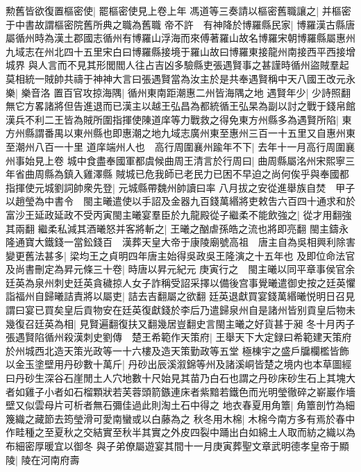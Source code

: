 勲舊皆欲復置樞密使|{
	罷樞密使見上卷上年}
馮道等三奏請以樞密舊職讓之|{
	并樞密于中書故謂樞密院舊所典之職為舊職}
帝不許　有神降於博羅縣民家|{
	博羅漢古縣唐屬循州時為漢土郡國志循州有博羅山浮海而來傅著羅山故名博羅宋朝博羅縣屬惠州九域志在州北四十五里宋白曰博羅縣接境于羅山故曰博羅東接龍州南接西平西接增城界}
與人言而不見其形閭閻人往占吉凶多驗縣吏張遇賢事之甚謹時循州盜賊羣起莫相統一賊帥共禱于神神大言曰張遇賢當為汝主於是共奉遇賢稱中天八國王改元永樂|{
	樂音洛}
置百官攻掠海隅|{
	循州東南距潮惠二州皆海隅之地}
遇賢年少|{
	少詩照翻}
無它方畧諸將但告進退而已漢主以越王弘昌為都統循王弘杲為副以討之戰于錢帛館漢兵不利二王皆為賊所圍指揮使陳道庠等力戰救之得免東方州縣多為遇賢所陷|{
	東方州縣謂番禺以東州縣也即惠潮之地九域志廣州東至惠州三百一十五里又自惠州東至潮州八百一十里}
道庠端州人也　高行周圍襄州踰年不下|{
	去年十一月高行周圍襄州事始見上卷}
城中食盡奉國軍都虞候曲周王清言於行周曰|{
	曲周縣屬洺州宋熙寧三年省曲周縣為鎮入雞澤縣}
賊城已危我師已老民力已困不早迫之尚何俟乎與奉國都指揮使元城劉詞帥衆先登|{
	元城縣帶魏州帥讀曰率}
八月拔之安從進舉族自焚　甲子以趙瑩為中書令　閩主曦遣使以手詔及金器九百錢萬緡將吏敕吿六百四十通求和於富沙王延政延政不受丙寅閩主曦宴羣臣於九龍殿從子繼柔不能飲強之|{
	從才用翻強其兩翻}
繼柔私減其酒曦怒并客將斬之|{
	王曦之酗虐孫皓之流也將即亮翻}
閩主鑄永隆通寶大鐵錢一當鈆錢百　漢葬天皇大帝于康陵廟號高祖　唐主自為吳相興利除害變更舊法甚多|{
	梁均王之貞明四年唐主始得吳政吳王隆演之十五年也}
及即位命法官及尚書刪定為昇元條三十卷|{
	時唐以昇元紀元}
庚寅行之　閩主曦以同平章事侯官余廷英為泉州刺史廷英貪穢掠人女子詐稱受詔采擇以備後宫事覺曦遣御史按之廷英懼詣福州自歸曦詰責將以屬吏|{
	詰去吉翻屬之欲翻}
廷英退獻買宴錢萬緡曦悦明日召見謂曰宴已買矣皇后貢物安在廷英復獻錢於李后乃遣歸泉州自是諸州皆别貢皇后物未幾復召廷英為相|{
	見賢遍翻復扶又翻幾居豈翻史言閩主曦之好貨甚于昶}
冬十月丙子張遇賢陷循州殺漢刺史劉傳　楚王希範作天策府|{
	王舉天下大定録曰希範建天策府於州城西北造天策光政等一十六樓及造天策勤政等五堂}
極棟宇之盛戶牖欄檻皆飾以金玉塗壁用丹砂數十萬斤|{
	丹砂出辰溪溆錦等州及諸溪峒皆楚之境内也本草圖經曰丹砂生深谷石崖閒土人穴地數十尺始見其苗乃白石也謂之丹砂床砂生石上其塊大者如雞子小者如石榴顆狀若芙蓉頭箭鏃連床者紫黯若鐵色而光明瑩徹碎之嶄巖作墻壁又似雲母片可析者無石彌佳過此則淘土石中得之}
地衣春夏用角簟|{
	角簟剖竹為細篾織之藏節去筠瑩滑可愛南蠻或以白藤為之}
秋冬用木棉|{
	木棉今南方多有焉於春中作畦種之至夏秋之交結實至秋半其實之外皮四裂中踊出白如綿土人取而紡之織以為布細密厚暖宜以御冬}
與子弟僚屬遊宴其間十一月庚寅葬聖文章武明德孝皇帝于顯陵|{
	陵在河南府壽}


